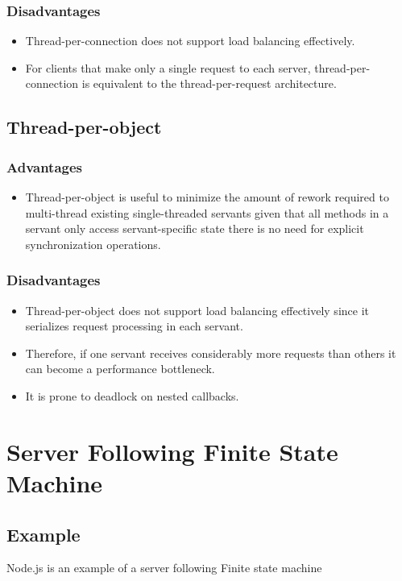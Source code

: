 \documentclass[11pt,a4paper]{article}
\begin{document}
			\subsubsection{Disadvantages}
			\begin{itemize}
				\item Thread-per-connection does not support load balancing effectively.
				\item For clients that make only a single request to each server, thread-per-connection is equivalent to the thread-per-request architecture.
			\end{itemize}
		\subsection{Thread-per-object}
			\subsubsection{Advantages}
			\begin{itemize}
				\item Thread-per-object is useful to minimize the amount of rework required to multi-thread existing single-threaded servants given that all methods in a servant only access servant-specific state there is no need for explicit synchronization operations.				
			\end{itemize}
			\subsubsection{Disadvantages}
			\begin{itemize}
				\item Thread-per-object does not support load balancing effectively since it serializes request processing in each servant. 
				\item Therefore, if one servant receives considerably more requests than others it can become a performance bottleneck. 
				\item It is prone to deadlock on nested callbacks.				
			\end{itemize}
	
	\section{Server Following Finite State Machine}
		\subsection{Example}
		Node.js is an example of a server following Finite state machine
\end{document}
